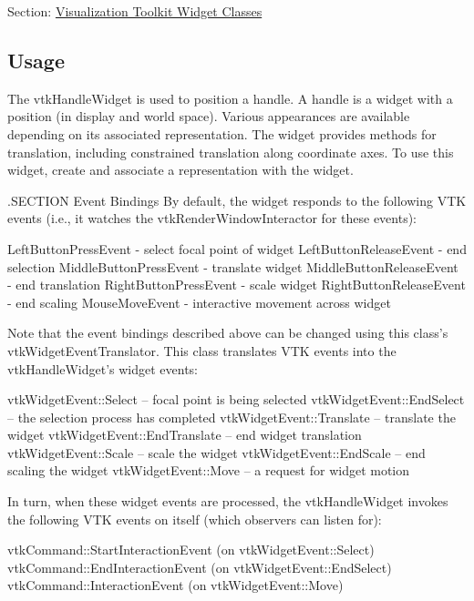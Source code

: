 Section\-: \hyperlink{sec_vtkwidgets}{Visualization Toolkit Widget Classes} \hypertarget{vtkwidgets_vtkxyplotwidget_Usage}{}\subsection{Usage}\label{vtkwidgets_vtkxyplotwidget_Usage}
The vtk\-Handle\-Widget is used to position a handle. A handle is a widget with a position (in display and world space). Various appearances are available depending on its associated representation. The widget provides methods for translation, including constrained translation along coordinate axes. To use this widget, create and associate a representation with the widget.

.S\-E\-C\-T\-I\-O\-N Event Bindings By default, the widget responds to the following V\-T\-K events (i.\-e., it watches the vtk\-Render\-Window\-Interactor for these events)\-: 
\begin{DoxyPre}
   LeftButtonPressEvent - select focal point of widget
   LeftButtonReleaseEvent - end selection
   MiddleButtonPressEvent - translate widget
   MiddleButtonReleaseEvent - end translation
   RightButtonPressEvent - scale widget
   RightButtonReleaseEvent - end scaling
   MouseMoveEvent - interactive movement across widget
 \end{DoxyPre}


Note that the event bindings described above can be changed using this class's vtk\-Widget\-Event\-Translator. This class translates V\-T\-K events into the vtk\-Handle\-Widget's widget events\-: 
\begin{DoxyPre}
   vtkWidgetEvent::Select -- focal point is being selected
   vtkWidgetEvent::EndSelect -- the selection process has completed
   vtkWidgetEvent::Translate -- translate the widget
   vtkWidgetEvent::EndTranslate -- end widget translation
   vtkWidgetEvent::Scale -- scale the widget
   vtkWidgetEvent::EndScale -- end scaling the widget
   vtkWidgetEvent::Move -- a request for widget motion
 \end{DoxyPre}


In turn, when these widget events are processed, the vtk\-Handle\-Widget invokes the following V\-T\-K events on itself (which observers can listen for)\-: 
\begin{DoxyPre}
   vtkCommand::StartInteractionEvent (on vtkWidgetEvent::Select)
   vtkCommand::EndInteractionEvent (on vtkWidgetEvent::EndSelect)
   vtkCommand::InteractionEvent (on vtkWidgetEvent::Move)
 \end{DoxyPre}


